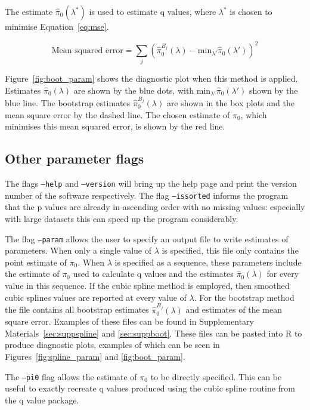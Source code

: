 \documentclass{amsart}
\begin{document}
The estimate $\hat{\pi}_0(\lambda^*)$ is used to estimate q values,  where $\lambda^*$ is chosen to minimise Equation~\ref{eq:mse}.

\begin{equation}
\text{Mean squared error} = \sum_j (\hat{\pi}^{B_j}_0(\lambda) - \text{min}_{\lambda'}\hat{\pi}_0(\lambda'))^2\label{eq:mse}
\end{equation}

Figure~\ref{fig:boot_param} shows the diagnostic plot when this method is applied. Estimates $\hat{\pi}_0(\lambda)$ are shown by the blue dots, with $\text{min}_{\lambda'}\hat{\pi}_0(\lambda')$ shown by the blue line. The bootstrap estimates $\hat{\pi}^{B_j}_0(\lambda)$ are shown in the box plots and the mean square error by the dashed line. The chosen estimate of $\pi_0$, which minimises this mean squared error, is shown by the red line.

\subsection{Other parameter flags}

The flags \texttt{--help} and \texttt{--version} will bring up the help page and print the version number of the software respectively. The flag \texttt{--issorted} informs the program that the p values are already in ascending order with no missing values: especially with large datasets this can speed up the program considerably.

The flag \texttt{--param} allows the user to specify an output file to write estimates of parameters. When only a single value of $\lambda$ is specified, this file only contains the point estimate of $\pi_0$. When $\lambda$ is specified as a sequence, these parameters include the estimate of $\pi_0$ used to calculate q values and the estimates $\hat{\pi}_0(\lambda)$ for every value in this sequence. If the cubic spline method is employed, then smoothed cubic splines values are reported at every value of $\lambda$. For the bootstrap method the file contains all bootstrap estimates $\hat{\pi}^{B_j}_0(\lambda)$ and estimates of the mean square error. Examples of these files can be found in Supplementary Materials~\ref{sec:suppspline} and \ref{sec:suppboot}. These files can be pasted into R to produce diagnostic plots, examples of which can be seen in Figures~\ref{fig:spline_param} and \ref{fig:boot_param}.

The \texttt{--pi0} flag allows the estimate of $\pi_0$ to be directly specified. This can be useful to exactly recreate q values produced using the cubic spline routine from the q value package.
\end{document}
